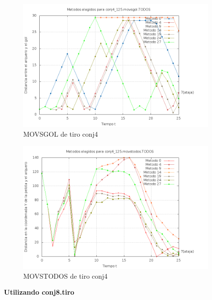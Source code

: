 \begin{figure}[H]
\begin{center}
\includegraphics[width=0.9\textwidth]{img/conj4_125_movsgol_TODOS_elegidos.png}
     \caption{MOVSGOL de tiro conj4}
\end{center}
\end{figure}

\begin{figure}[H]
\begin{center}
\includegraphics[width=0.9\textwidth]{img/conj4_125_movstodos_TODOS_elegidos.png}
     \caption{MOVSTODOS de tiro conj4}
\end{center}
\end{figure}



\textbf{Utilizando conj8.tiro}

